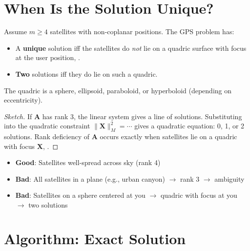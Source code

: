 \section{When Is the Solution Unique?}
\label{sec:gps:unique}

\begin{theorem}
Assume $m \ge 4$ satellites with non-coplanar positions. The GPS problem has: \cite{boutin2025gps}
\begin{itemize}
    \item A \textbf{unique} solution iff the satellites do \emph{not} lie on a quadric surface with focus at the user position, \cite{boutin2025gps}.
    \item \textbf{Two} solutions iff they do lie on such a quadric.
\end{itemize}
The quadric is a sphere, ellipsoid, paraboloid, or hyperboloid (depending on eccentricity).
\end{theorem}

\begin{proof}[Sketch]
If $\bm{A}$ has rank 3, the linear system gives a line of solutions. Substituting into the quadratic constraint $\|\bm{X}\|_M^2 = \cdots$ gives a quadratic equation: 0, 1, or 2 solutions. Rank deficiency of $\bm{A}$ occurs exactly when satellites lie on a quadric with focus $\bm{X}$, \cite{boutin2025gps}.
\end{proof}

\begin{example}
\begin{itemize}
    \item \textbf{Good}: Satellites well-spread across sky (rank 4)
    \item \textbf{Bad}: All satellites in a plane (e.g., urban canyon) $\to$ rank 3 $\to$ ambiguity \cite{boutin2025gps}
    \item \textbf{Bad}: Satellites on a sphere centered at you $\to$ quadric with focus at you $\to$ two solutions
\end{itemize}
\end{example}

\section{Algorithm: Exact Solution}
\label{sec:gps:algorithm}

